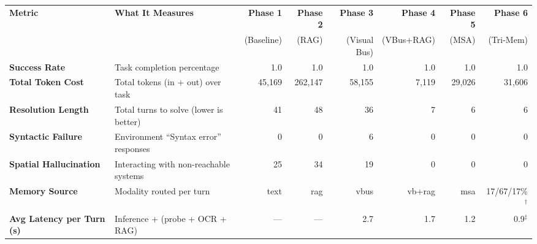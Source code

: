\documentclass[25pt, a0paper, landscape, blockverticalspace=5mm]{tikzposter}
\begin{document}
\begin{columns}
{{                \vspace{0.5em}
                \footnotesize
                \begin{tabularx}{\linewidth}{@{} l X r r r r r r @{}}
                    \toprule
                    \textbf{Metric}                   & \textbf{What It Measures}                        & \textbf{Phase 1} & \textbf{Phase 2} & \textbf{Phase 3} & \textbf{Phase 4} & \textbf{Phase 5} & \textbf{Phase 6}       \\
                                                      &                                                  & (Baseline)       & (RAG)            & (Visual Bus)     & (VBus+RAG)       & (MSA)            & (Tri-Mem)              \\
                    \midrule
                    \textbf{Success Rate}             & Task completion percentage                       & 1.0              & 1.0              & 1.0              & 1.0              & 1.0              & 1.0                    \\
                    \textbf{Total Token Cost}         & Total tokens (in + out) over task                & 45,169           & 262,147          & 58,155           & 7,119            & 29,026           & 31,606                 \\
                    \textbf{Resolution Length}        & Total turns to solve (lower is better)           & 41               & 48               & 36               & 7                & 6                & 6                      \\
                    \textbf{Syntactic Failure}        & Environment ``Syntax error'' responses           & 0                & 0                & 6                & 0                & 0                & 0                      \\
                    \textbf{Spatial Hallucination}    & Interacting with non-reachable systems           & 25               & 34               & 19               & 0                & 0                & 0                      \\
                    \textbf{Memory Source}            & Modality routed per turn                         & text             & rag              & vbus             & vb+rag           & msa              & 17/67/17\%$^{\dagger}$ \\
                    \textbf{Avg Latency per Turn (s)} & Inference + (probe + OCR + RAG)                  & ---              & ---              & 2.7              & 1.7              & 1.2              & 0.9$^{\ddagger}$       \\

\end{tabularx}}}
\end{columns}
\end{document}
